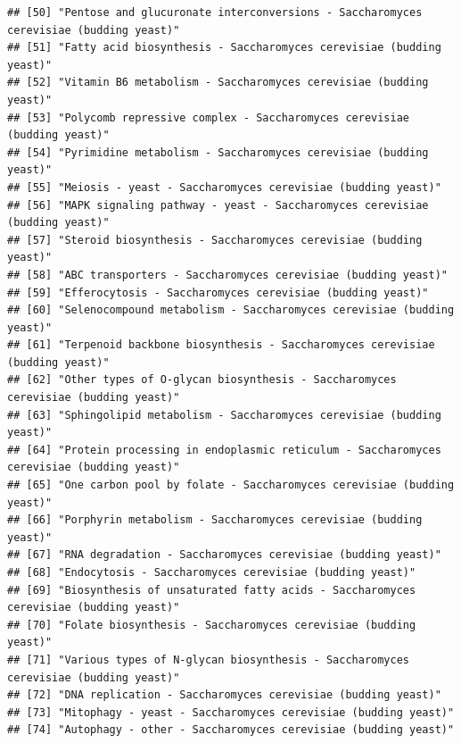 \documentclass[
]{book}
\begin{document}
\begin{verbatim}
## [50] "Pentose and glucuronate interconversions - Saccharomyces cerevisiae (budding yeast)"              
## [51] "Fatty acid biosynthesis - Saccharomyces cerevisiae (budding yeast)"                               
## [52] "Vitamin B6 metabolism - Saccharomyces cerevisiae (budding yeast)"                                 
## [53] "Polycomb repressive complex - Saccharomyces cerevisiae (budding yeast)"                           
## [54] "Pyrimidine metabolism - Saccharomyces cerevisiae (budding yeast)"                                 
## [55] "Meiosis - yeast - Saccharomyces cerevisiae (budding yeast)"                                       
## [56] "MAPK signaling pathway - yeast - Saccharomyces cerevisiae (budding yeast)"                        
## [57] "Steroid biosynthesis - Saccharomyces cerevisiae (budding yeast)"                                  
## [58] "ABC transporters - Saccharomyces cerevisiae (budding yeast)"                                      
## [59] "Efferocytosis - Saccharomyces cerevisiae (budding yeast)"                                         
## [60] "Selenocompound metabolism - Saccharomyces cerevisiae (budding yeast)"                             
## [61] "Terpenoid backbone biosynthesis - Saccharomyces cerevisiae (budding yeast)"                       
## [62] "Other types of O-glycan biosynthesis - Saccharomyces cerevisiae (budding yeast)"                  
## [63] "Sphingolipid metabolism - Saccharomyces cerevisiae (budding yeast)"                               
## [64] "Protein processing in endoplasmic reticulum - Saccharomyces cerevisiae (budding yeast)"           
## [65] "One carbon pool by folate - Saccharomyces cerevisiae (budding yeast)"                             
## [66] "Porphyrin metabolism - Saccharomyces cerevisiae (budding yeast)"                                  
## [67] "RNA degradation - Saccharomyces cerevisiae (budding yeast)"                                       
## [68] "Endocytosis - Saccharomyces cerevisiae (budding yeast)"                                           
## [69] "Biosynthesis of unsaturated fatty acids - Saccharomyces cerevisiae (budding yeast)"               
## [70] "Folate biosynthesis - Saccharomyces cerevisiae (budding yeast)"                                   
## [71] "Various types of N-glycan biosynthesis - Saccharomyces cerevisiae (budding yeast)"                
## [72] "DNA replication - Saccharomyces cerevisiae (budding yeast)"                                       
## [73] "Mitophagy - yeast - Saccharomyces cerevisiae (budding yeast)"                                     
## [74] "Autophagy - other - Saccharomyces cerevisiae (budding yeast)"                                     

\end{verbatim}
\end{document}

